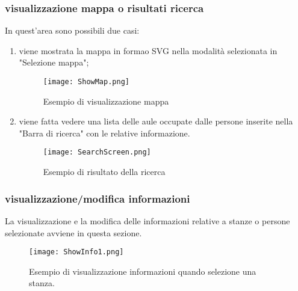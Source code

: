 \subsubsection*{visualizzazione mappa o risultati ricerca}
In quest'area sono possibili due casi:
\begin{enumerate}
\item viene mostrata la mappa in formao SVG nella modalità selezionata in "Selezione mappa";

\begin{figure}[!htb]
\centering%
\texttt{[image: ShowMap.png]}
\caption{Esempio di visualizzazione mappa}\label{Screen:showmap}%
\end{figure}
\FloatBarrier

\item viene fatta vedere una lista delle aule occupate dalle persone inserite nella "Barra di ricerca" con le relative informazione.

\begin{figure}[!htb]
\centering%
\texttt{[image: SearchScreen.png]}%
\caption{Esempio di risultato della ricerca}\label{Screen:search}%
\end{figure}
\FloatBarrier

\end{enumerate}

\subsubsection*{visualizzazione/modifica informazioni}
La visualizzazione e la modifica delle informazioni relative a stanze o persone selezionate avviene in questa sezione.

\begin{figure}[!htb]
\centering%
\texttt{[image: ShowInfo1.png]}%
\caption{Esempio di visualizzazione informazioni quando selezione una stanza.}\label{Screen:info1}%
\end{figure}
\FloatBarrier


